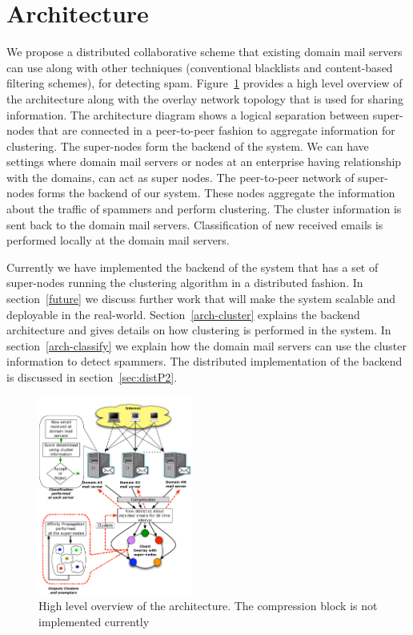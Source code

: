 \section{Architecture}
\label{arch} 
We propose a distributed collaborative scheme that existing domain mail servers can use along with other techniques (conventional blacklists and content-based filtering schemes), for detecting spam. Figure~\ref{fig:architecture} provides a high level overview of the architecture along with the overlay network topology that is used for sharing information. The architecture diagram shows a logical separation between super-nodes that are connected in a peer-to-peer fashion to aggregate information for clustering. The super-nodes form the backend of the system. We can have settings where domain mail servers or nodes at an enterprise having relationship with the domains, can act as super nodes. The peer-to-peer network of super-nodes forms the backend of our system. These nodes aggregate the information about the traffic of spammers and perform clustering. The cluster information is sent back to the domain mail servers. Classification of new received emails is performed locally at the domain mail servers.

Currently we have implemented the backend of the system that has a set of super-nodes running the clustering algorithm in a distributed fashion. In section~\ref{future} we discuss further work that will make the system scalable and deployable in the real-world. Section~\ref{arch-cluster} explains the backend architecture and gives details on how clustering is performed in the system. In section~\ref{arch-classify} we explain how the domain mail servers can use the cluster information to detect spammers. The distributed implementation of the backend is discussed in section~\ref{sec:distP2}.

\begin{figure}[t]%
\centering
\includegraphics[width=0.45\textwidth]{figures/architecture.pdf}
\caption{High level overview of the architecture. The compression block is not implemented currently}
\label{fig:architecture}
\end{figure}
